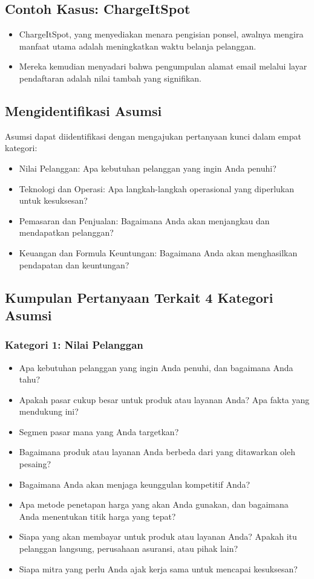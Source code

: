 \documentclass{article}
\begin{document}
\subsection{Contoh Kasus: ChargeItSpot}
\begin{itemize}
    \item ChargeItSpot, yang menyediakan menara pengisian ponsel, awalnya mengira manfaat utama adalah meningkatkan waktu belanja pelanggan.
    \item Mereka kemudian menyadari bahwa pengumpulan alamat email melalui layar pendaftaran adalah nilai tambah yang signifikan.
\end{itemize}

\subsection{Mengidentifikasi Asumsi}
Asumsi dapat diidentifikasi dengan mengajukan pertanyaan kunci dalam empat kategori:
\begin{itemize}
    \item Nilai Pelanggan: Apa kebutuhan pelanggan yang ingin Anda penuhi?
    \item Teknologi dan Operasi: Apa langkah-langkah operasional yang diperlukan untuk kesuksesan?
    \item Pemasaran dan Penjualan: Bagaimana Anda akan menjangkau dan mendapatkan pelanggan?
    \item Keuangan dan Formula Keuntungan: Bagaimana Anda akan menghasilkan pendapatan dan keuntungan?
\end{itemize}

\subsection{Kumpulan Pertanyaan Terkait 4 Kategori Asumsi}
\subsubsection{Kategori 1: Nilai Pelanggan}
\begin{itemize}
    \item Apa kebutuhan pelanggan yang ingin Anda penuhi, dan bagaimana Anda tahu?
    \item Apakah pasar cukup besar untuk produk atau layanan Anda? Apa fakta yang mendukung ini?
    \item Segmen pasar mana yang Anda targetkan?
    \item Bagaimana produk atau layanan Anda berbeda dari yang ditawarkan oleh pesaing?
    \item Bagaimana Anda akan menjaga keunggulan kompetitif Anda?
    \item Apa metode penetapan harga yang akan Anda gunakan, dan bagaimana Anda menentukan titik harga yang tepat?
    \item Siapa yang akan membayar untuk produk atau layanan Anda? Apakah itu pelanggan langsung, perusahaan asuransi, atau pihak lain?
    \item Siapa mitra yang perlu Anda ajak kerja sama untuk mencapai kesuksesan?
\end{itemize}
\end{document}
